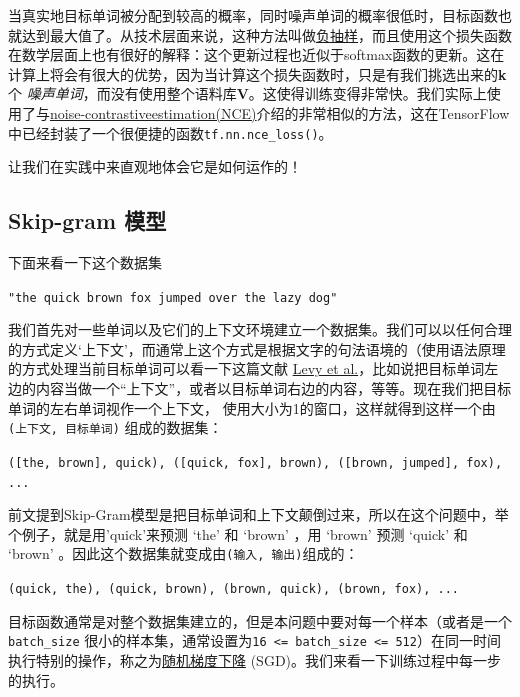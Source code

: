 当真实地目标单词被分配到较高的概率，同时噪声单词的概率很低时，目标函数也就达到最大值了。从技术层面来说，这种方法叫做\href{http://papers.nips.cc/paper/5021-distributed-representations-of-words-and-phrases-and-their-compositionality.pdf}{负抽样}，而且使用这个损失函数在数学层面上也有很好的解释：这个更新过程也近似于softmax函数的更新。这在计算上将会有很大的优势，因为当计算这个损失函数时，只是有我们挑选出来的\textbf{k} 个 \emph{噪声单词}，而没有使用整个语料库\textbf{V}。这使得训练变得非常快。我们实际上使用了与\href{http://papers.nips.cc/paper/5165-learning-word-embeddings-efficiently-with-noise-contrastive-estimation.pdf}{noise-contrastiveestimation(NCE)}介绍的非常相似的方法，这在TensorFlow中已经封装了一个很便捷的函数\lstinline{tf.nn.nce_loss()}。

让我们在实践中来直观地体会它是如何运作的！

\subsection{Skip-gram 模型}\label{skip-gram_model}

下面来看一下这个数据集

\lstinline{"the quick brown fox jumped over the lazy dog"}

我们首先对一些单词以及它们的上下文环境建立一个数据集。我们可以以任何合理的方式定义`上下文'，而通常上这个方式是根据文字的句法语境的（使用语法原理的方式处理当前目标单词可以看一下这篇文献
\href{https://levyomer.files.wordpress.com/2014/04/dependency-based-word-embeddings-acl-2014.pdf}{Levy et al.}，比如说把目标单词左边的内容当做一个“上下文”，或者以目标单词右边的内容，等等。现在我们把目标单词的左右单词视作一个上下文，
使用大小为1的窗口，这样就得到这样一个由\texttt{(上下文,\ 目标单词)}
组成的数据集：

\texttt{({[}the,\ brown{]},\ quick),\ ({[}quick,\ fox{]},\ brown),\ ({[}brown,\ jumped{]},\ fox),\ ...}

前文提到Skip-Gram模型是把目标单词和上下文颠倒过来，所以在这个问题中，举个例子，就是用'quick'来预测
`the' 和 `brown' ，用 `brown' 预测 `quick' 和 `brown'
。因此这个数据集就变成由\texttt{(输入,\ 输出)}组成的：

\texttt{(quick,\ the),\ (quick,\ brown),\ (brown,\ quick),\ (brown,\ fox),\ ...}

目标函数通常是对整个数据集建立的，但是本问题中要对每一个样本（或者是一个\texttt{batch\_size}
很小的样本集，通常设置为\texttt{16\ \textless{}=\ batch\_size\ \textless{}=\ 512}）在同一时间执行特别的操作，称之为\href{https://en.wikipedia.org/wiki/Stochastic_gradient_descent}{随机梯度下降}
(SGD)。我们来看一下训练过程中每一步的执行。

